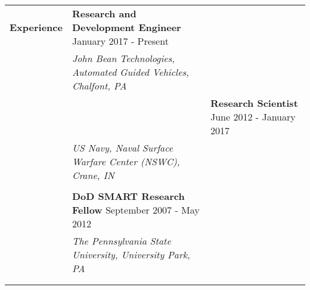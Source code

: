 \begin{tabular}{L{\hlcolw}  L{\rcolw}}
\textbf{\Large Experience} & \textbf{\large Research and Development Engineer} \hfill {\large January 2017 - Present}  
\vspace{0.05in} 
\\
& \textit{\large John Bean Technologies, Automated Guided Vehicles, Chalfont, PA} \\ 
&
\vspace{-0.2in} 


& \textbf{\large Research Scientist} \hfill {\large June 2012 - January 2017}  
\vspace{0.05in} \\
& \textit{\large US Navy, Naval Surface Warfare Center (NSWC), Crane, IN} \\ 
&
\vspace{-0.2in} 

\\

& \textbf{\large DoD SMART Research Fellow} \hfill {\large September 2007 - May 2012}  
\vspace{0.05in} \\
& \textit{\large The Pennsylvania State University, University Park, PA} \\ 
& 
\vspace{-0.2in} 


\\
	\hline 
	\hline \\  
\end{tabular}